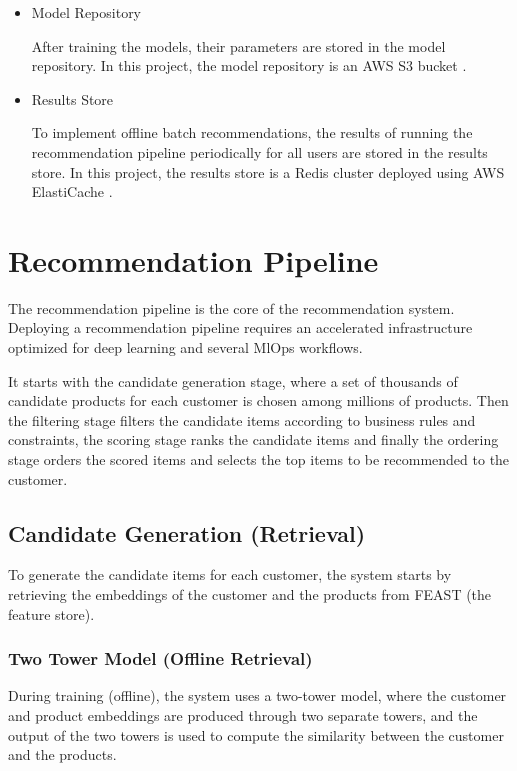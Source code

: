 \begin{itemize}
    \item Model Repository
    \begin{displayquote}
        After training the models, their parameters are stored in the model repository. In this project, the model repository is an AWS S3 bucket \cite{AwsS3}. 
    \end{displayquote}
    \item Results Store
    \begin{displayquote}
       To implement offline batch recommendations, the results of running the recommendation pipeline periodically for all users are stored in the results store. 
       In this project, the results store is a Redis\cite{Redis} cluster deployed using AWS ElastiCache \cite{AwsElastiCache}.
    \end{displayquote}
\end{itemize}

\section{Recommendation Pipeline}

The recommendation pipeline is the core of the recommendation system.
Deploying a recommendation pipeline requires an accelerated infrastructure optimized for deep learning and several MlOps workflows.

It starts with the candidate generation stage, where a set of thousands of candidate products for each customer is chosen among millions of products.
Then the filtering stage filters the candidate items according to business rules and constraints, the scoring stage ranks the candidate items and finally the ordering stage orders 
the scored items and selects the top items to be recommended to the customer.

\subsection{Candidate Generation (Retrieval)}

To generate the candidate items for each customer, the system starts by retrieving the embeddings of the customer and the products from FEAST (the feature store).

\subsubsection{Two Tower Model (Offline Retrieval)}

During training (offline), the system uses a two-tower model, where the customer and product embeddings are produced through two separate towers, 
and the output of the two towers is used to compute the similarity between the customer and the products.

